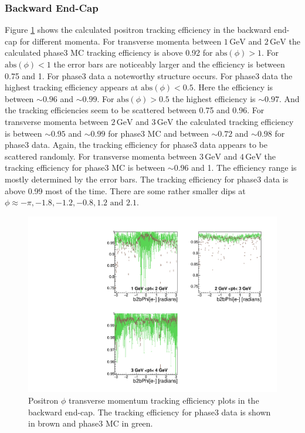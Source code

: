 \documentclass[a4paper,11pt,twosided,final,german,openbib,pdftex,listof=totoc,bibliography=totoc]{scrbook}
\begin{document}
\clearpage

\subsubsection{Backward End-Cap}


Figure \ref{plt:xPtMPhiepEC3} shows the calculated positron tracking efficiency in the backward end-cap for different momenta.
For transverse momenta between $1\,\textrm{GeV}$ and $2\,\textrm{GeV}$ the calculated phase3 MC tracking efficiency is above 0.92 for $\textrm{abs}(\phi) >1$. For $\textrm{abs}(\phi)<1$ the error bars are noticeably larger and the efficiency is between 0.75 and 1. For phase3 data a noteworthy structure occurs. For phase3 data the highest tracking efficiency appears at $\textrm{abs}(\phi) <0.5$. Here the efficiency is between $\sim 0.96$ and $\sim 0.99$. For $\textrm{abs}(\phi) > 0.5$ the highest efficiency is $\sim 0.97$. And the tracking efficiencies seem to be scattered between 0.75 and 0.96.
For transverse momenta between $2\,\textrm{GeV}$ and $3\,\textrm{GeV}$ the calculated tracking efficiency is between $\sim 0.95$ and $\sim 0.99$ for phase3 MC and between $\sim 0.72$ and $\sim 0.98$ for phase3 data. Again, the tracking efficiency for phase3 data appears to be scattered randomly.
For transverse momenta between $3\,\textrm{GeV}$ and $4\,\textrm{GeV}$ the tracking efficiency for phase3 MC is between $\sim 0.96$ and 1. The efficiency range is mostly determined by the error bars. The tracking efficiency for phase3 data is above 0.99 most of the time. There are some rather smaller dips at $\phi \approx -\pi, -1.8, -1.2, -0.8, 1.2 \textrm{ and } 2.1$.



\begin{figure}[!htbp]
	\centering
	\includegraphics[width=\textwidth]{Plots/master3/xPtMPhiepECP3}
	\caption[Transverse Momentum $\phi$ Positron Backward End-Cap Efficiency Phase3]{Positron $\phi$ transverse momentum tracking efficiency plots in the backward end-cap. The tracking efficiency for phase3 data is shown in brown and phase3 MC in green.}
	
	\label{plt:xPtMPhiepEC3}
\end{figure}
\end{document}
